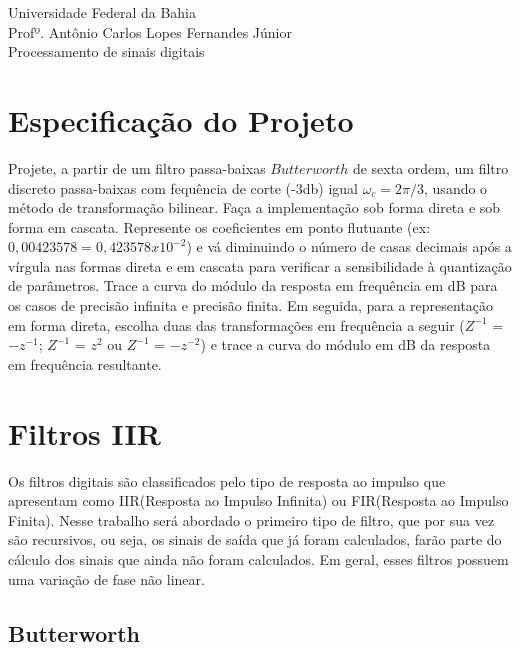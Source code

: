 \documentclass[12pt]{article}
\begin{document}
\maketitle

\noindent
Universidade Federal da Bahia\\
Profº. Antônio Carlos Lopes Fernandes Júnior\\
Processamento de sinais digitais


\section{Especifica\c c\~ao do Projeto}
\label{sec1}

Projete, a partir de um filtro passa-baixas $Butterworth$ de sexta ordem, um filtro discreto passa-baixas com fequ\^encia de corte (-3db) igual $\omega_c=2\pi/3$, usando o m\'etodo de transforma\c c\~ao bilinear. Fa\c ca a implementa\c c\~ao sob forma direta e sob forma em cascata. Represente os coeficientes em ponto flutuante (ex: $0,00423578 = 0,423578 x 10^{-2}$) e v\'a diminuindo o n\'umero de casas decimais ap\'os a v\'irgula nas formas direta e em cascata para verificar a sensibilidade \`a quantiza\c c\~ao de par\^ametros. Trace a curva do m\'odulo da resposta em frequ\^encia em dB para os casos de precis\~ao infinita e precis\~ao finita. Em seguida, para a representa\c c\~ao em forma direta, escolha duas das transforma\c c\~oes em frequ\^encia a seguir ($Z^{-1}$ = $-z^{-1}$; $Z^{-1}$ = $z^2$ ou $Z^{-1}$ = $-z^{-2}$) e trace a curva do m\'odulo em dB da resposta em frequ\^encia resultante.


\section{Filtros IIR}
\label{sec2}

Os filtros digitais s\~ao classificados pelo tipo de resposta ao impulso que apresentam como IIR(Resposta ao Impulso Infinita) ou FIR(Resposta ao Impulso Finita). Nesse trabalho ser\'a abordado o primeiro tipo de filtro, que por sua vez s\~ao recursivos, ou seja, os sinais de sa\'ida que j\'a foram calculados, far\~ao parte do c\'alculo dos sinais que ainda n\~ao foram calculados. Em geral, esses filtros possuem uma varia\c c\~ao de fase n\~ao linear.

\subsection{Butterworth}
\label{sec21}
\end{document}
